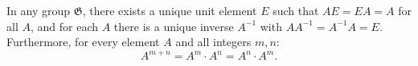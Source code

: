 In any group $\mathfrak{G}$, there exists a unique unit element $E$ such that $AE = EA = A$ for all $A$, and for each $A$ there is a unique inverse $A^{-1}$ with $AA^{-1} = A^{-1}A = E$. Furthermore, for every element $A$ and all integers $m, n$:
$$A^{m+n} = A^m \cdot A^n = A^n \cdot A^m.$$

